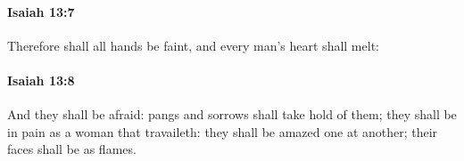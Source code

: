 		\paragraph{Isaiah 13:7} %
			\label{ISAIAH-13-7}

			Therefore shall all hands be faint, and every man's heart shall melt:


		\paragraph{Isaiah 13:8} %
			\label{ISAIAH-13-8}

			And they shall be afraid: pangs and sorrows shall take hold of them; they shall be in pain as a woman that travaileth: they shall be amazed one at another; their faces shall be as flames.


